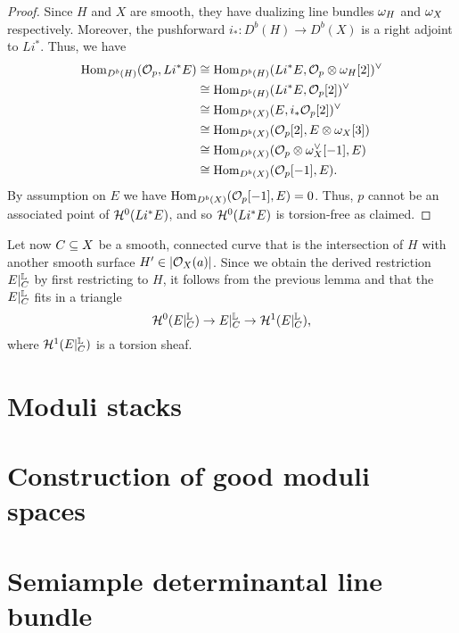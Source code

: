 \documentclass[letterpaper,10pt]{article}
\theoremstyle{remark}
\begin{document}
\begin{proof}
Since $H$ and $X$ are smooth, they have dualizing line bundles $\omega_H$ and $\omega_X$ respectively. Moreover, the pushforward $i_*: D^b(H) \to D^b(X)$ is a right adjoint to $L i^*$. Thus, we have
\begin{align*}
    \mathrm{Hom}_{D^b(H)}(\mathcal{O}_p, L i^* E) & \cong \mathrm{Hom}_{D^b(H)}(L i^* E, \mathcal{O}_p \otimes \omega_H[2])^\vee \\
    & \cong \mathrm{Hom}_{D^b(H)}(L i^* E, \mathcal{O}_p[2])^\vee \\
    & \cong \mathrm{Hom}_{D^b(X)}(E, i_*\mathcal{O}_p[2])^\vee \\
    & \cong \mathrm{Hom}_{D^b(X)}(\mathcal{O}_p[2], E \otimes \omega_X[3]) \\
    & \cong \mathrm{Hom}_{D^b(X)}(\mathcal{O}_p \otimes \omega_X^\vee[-1], E) \\
    & \cong \mathrm{Hom}_{D^b(X)}(\mathcal{O}_p[-1], E).
\end{align*}
By assumption on $E$ we have $\mathrm{Hom}_{D^b(X)}(\mathcal{O}_p[-1], E) = 0$. Thus, $p$ cannot be an associated point of $\mathcal{H}^0(L i^* E)$, and so $\mathcal{H}^0(L i^* E)$ is torsion-free as claimed.
\end{proof}

Let now $C \subseteq X$ be a smooth, connected curve that is the intersection of $H$ with another smooth surface $H' \in |\mathcal{O}_X(a)|$. Since we obtain the derived restriction $E|^{\mathbb{L}}_C$ by first restricting to $H$, it follows from the previous lemma and \cite[Lemma 6.3]{t} that the $E|^{\mathbb{L}}_C$ fits in a triangle
\[ \mathcal{H}^0(E|^{\mathbb{L}}_C) \to E|^{\mathbb{L}}_C \to \mathcal{H}^1(E|^{\mathbb{L}}_C), \]
where $\mathcal{H}^1(E|^{\mathbb{L}}_C)$ is a torsion sheaf.

\section{Moduli stacks}

\section{Construction of good moduli spaces}

\section{Semiample determinantal line bundle}
\end{document}
